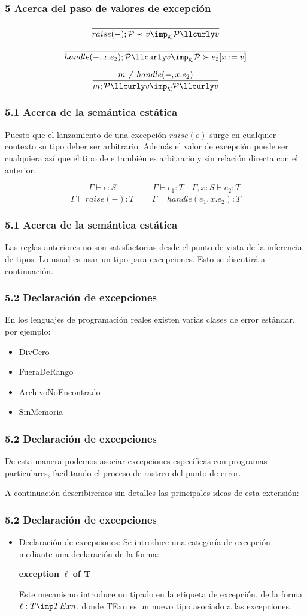 \documentclass[xcolor=dvipsnames,table,spanish]{beamer}
\begin{document}
\begin{frame}
\frametitle{5 Acerca del paso de valores de excepción}

\[\frac{}{raise(-); \mathcal{P} \prec v \imp_{\mathcal{K}} \mathcal{P} \llcurly v}\]

\[\frac{}{handle(-,x.e_2); \mathcal{P} \llcurly v \imp_{\mathcal{K}} \mathcal{P} \succ e_2[x:=v]}\]

\[\frac{m \neq handle(-,x.e_2)}{m; \mathcal{P} \llcurly v \imp_{\mathcal{K}} \mathcal{P} \llcurly v}\]
\end{frame}
\begin{frame}
\frametitle{5.1 Acerca de la semántica estática}
Puesto que el lanzamiento de una excepción $raise(e)$ surge en cualquier contexto su tipo deber ser arbitrario. Además el valor de excepción puede ser cualquiera así que el tipo de e también es arbitrario y sin relación directa con el anterior.

\[\frac{\Gamma \vdash e:S}{\Gamma \vdash raise(-):T} \qquad \frac{\Gamma \vdash e_1:T \quad \Gamma,x:S \vdash e_2:T}{\Gamma \vdash handle(e_1,x.e_2):T}\]
\end{frame}
\begin{frame}
\frametitle{5.1 Acerca de la semántica estática}
Las reglas anteriores no son satisfactorias desde el punto de vista de la inferencia de tipos. Lo usual es usar un tipo para excepciones. Esto se discutirá a continuación.
\end{frame}
\begin{frame}
\frametitle{5.2 Declaración de excepciones}
En los lenguajes de programación reales existen varias clases de error estándar, por ejemplo:
\begin{itemize}
\item DivCero
\item FueraDeRango
\item ArchivoNoEncontrado
\item SinMemoria
\end{itemize}
\end{frame}
\begin{frame}
\frametitle{5.2 Declaración de excepciones}
De esta manera podemos asociar excepciones específicas con programas particulares, facilitando el proceso de rastreo del punto de error.\newline

A continuación describiremos sin detalles las principales ideas de esta extensión:
\end{frame}
\begin{frame}
\frametitle{5.2 Declaración de excepciones}

\begin{itemize}
\item Declaración de excepciones: Se introduce una categoría de excepción mediante una declaración de la forma:
\begin{center}
\textbf{exception} $\ell$ \textbf{of T}
\end{center}
Este mecanismo introduce un tipado en la etiqueta de excepción, de la forma $\ell : T \imp TExn$, donde TExn es un nuevo tipo asociado a las excepciones.
\end{itemize}

\end{frame}
\end{document}
